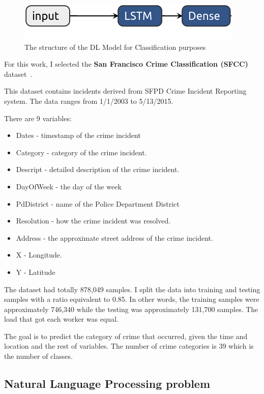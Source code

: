 \begin{figure}[H]
    \centering
    \includegraphics[scale=.3]{./images/impl/class-model.png}
    \caption{The structure of the DL Model for Classification purposes}
    \label{fig:dl_class_model}
\end{figure}

For this work, I selected the \textbf{San Francisco Crime Classification (SFCC)} dataset~\cite{sfc_dataset}.

This dataset contains incidents derived from SFPD Crime Incident Reporting system.
The data ranges from 1/1/2003 to 5/13/2015.

There are 9 variables:

\begin{itemize}
    \item Dates - timestamp of the crime incident
    \item Category - category of the crime incident.
    \item Descript - detailed description of the crime incident.
    \item DayOfWeek - the day of the week
    \item PdDistrict - name of the Police Department District
    \item Resolution - how the crime incident was resolved.
    \item Address - the approximate street address of the crime incident.
    \item X - Longitude.
    \item Y - Latitude
\end{itemize}

The dataset had totally 878,049 samples.
I split the data into training and testing samples with a ratio equivalent to 0.85.
In other words, the training samples were approximately 746,340 while the testing was approximately 131,700 samples.
The load that got each worker was equal.

The goal is to predict the category of crime that occurred, given the time and location and the rest of variables.
The number of crime categories is $39$ which is the number of classes.

\subsection{Natural Language Processing problem}\label{subsec:natural-language-processing-problem}

